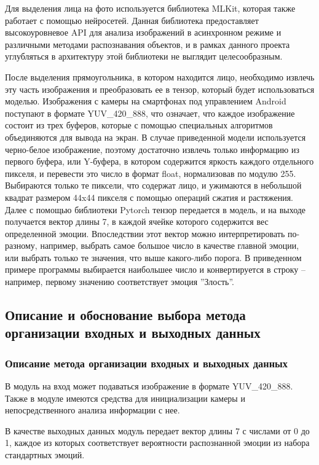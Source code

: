 \documentclass[a4paper,12pt]{article}
\begin{document}
    Для выделения лица на фото используется библиотека MLKit, которая также работает с помощью нейросетей.
    Данная библиотека предоставляет высокоуровневое API для анализа изображений в асинхронном режиме и различными методами распознавания объектов,
    и в рамках данного проекта углубляться в архитектуру этой библиотеки не выглядит целесообразным.

    После выделения прямоугольника, в котором находится лицо, необходимо извлечь эту часть изображения и преобразовать ее в тензор, который будет использоваться моделью.
    Изображения с камеры на смартфонах под управлением Android поступают в формате YUV\_420\_888, что означает, что каждое изображение состоит из трех буферов, которые с помощью специальных алгоритмов объединяются для вывода на экран.
    В случае приведенной модели используется черно-белое изображение, поэтому достаточно извлечь только информацию из первого буфера, или Y-буфера, в котором содержится яркость каждого отдельного пикселя, и перевести это число в формат float, нормализовав по модулю 255.
    Выбираются только те пиксели, что содержат лицо, и ужимаются в небольшой квадрат размером 44x44 пикселя с помощью операций сжатия и растяжения.
    Далее с помощью библиотеки Pytorch тензор передается в модель, и на выходе получается вектор длины 7, в каждой ячейке которого содержится вес определенной эмоции.
    Впоследствии этот вектор можно интерпретировать по-разному, например, выбрать самое большое число в качестве главной эмоции, или выбрать только те значения, что выше какого-либо порога.
    В приведенном примере программы выбирается наибольшее число и конвертируется в строку -- например, первому значению соответствует эмоция ''Злость''.

    \subsection{Описание и обоснование выбора метода организации входных и выходных данных}

    \subsubsection{Описание метода организации входных и выходных данных}

    В модуль на вход может подаваться изображение в формате YUV_420_888.
    Также в модуле имеются средства для инициализации камеры и непосредственного анализа информации с нее.

    В качестве выходных данных модуль передает вектор длины 7 с числами от 0 до 1, каждое из которых соответствует вероятности распознанной эмоции из набора стандартных эмоций.
\end{document}
